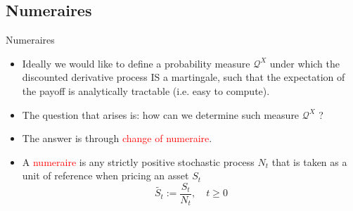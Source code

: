 \documentclass{beamer}
\begin{document}
\subsection{Numeraires}
\begin{frame}{Numeraires}
  \begin{itemize}
  \item<1-> Ideally we would like to define a probability measure $\mathcal{Q}^X$ under which the discounted derivative process IS a martingale, such that the expectation of the payoff is analytically tractable (i.e. easy to compute).
  \item<2-> The question that arises is: how can we determine such measure $\mathcal{Q}^X$ ?
  \item<3-> The answer is through \textcolor{red}{change of numeraire}.
  \item<4-> A \textcolor{red}{numeraire} is any strictly positive stochastic process $N_t$ that is taken as a unit of reference when pricing an asset $S_t$
    \begin{equation*}
      \tilde{S_t}:=\frac{S_t}{N_t}, \quad t \ge 0
    \end{equation*}
  \end{itemize}
\end{frame}
\end{document}
